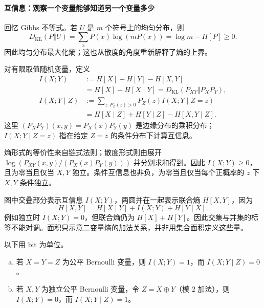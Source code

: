 \documentclass[lang=cn,a4paper,fontset=none,zihao=false,10pt,openany,twoside]{beautybook}
\numberwithin{algorithm}{chapter}
\newcommand{\KLsep}{\mathrel{\Vert}}
\begin{document}
\paragraph{互信息：观察一个变量能够知道另一个变量多少}
回忆 Gibbs 不等式。若 $U$ 是 $m$ 个符号上的均匀分布，则
\[
 D_{\mathrm{KL}}(P\KLsep U)=\sum_xP(x)\log(mP(x))=\log m-H[P]\ge0.
\]
因此均匀分布最大化熵；这也从散度的角度重新解释了熵的上界。
\begin{definition}[互信息与条件互信息]\label{def:mutual-information}
对有限取值随机变量，定义
\begin{align*}
 I(X;Y)&:=H[X]+H[Y]-H[X,Y]\\
 &=H[X]-H[X\mid Y]=D_{\mathrm{KL}}(P_{XY}\KLsep P_XP_Y),\\
 I(X;Y\mid Z)&:=\sum_{z:P_Z(z)>0}P_Z(z)I(X;Y\mid Z=z)\\
 &=H[X\mid Z]+H[Y\mid Z]-H[X,Y\mid Z].
\end{align*}
这里 $(P_XP_Y)(x,y)=P_X(x)P_Y(y)$ 是边缘分布的乘积分布；$I(X;Y\mid Z=z)$ 指在给定 $Z=z$ 的条件分布下计算互信息。
\end{definition}
熵形式的等价性来自链式法则；散度形式则由展开
$\log(P_{XY}(x,y)/(P_X(x)P_Y(y)))$ 并分别求和得到。因此 $I(X;Y)\ge0$，且为零当且仅当 $X,Y$ 独立。条件互信息也非负，为零当且仅当每个正概率的 $z$ 下 $X,Y$ 条件独立。
\begin{center}
\end{center}
图中交叠部分表示互信息 $I(X;Y)$，两圆并在一起表示联合熵 $H[X,Y]$，因为
\[
 H[X,Y]=H[X\mid Y]+I(X;Y)+H[Y\mid X].
\]
例如独立时 $I(X;Y)=0$，但联合熵仍为 $H[X]+H[Y]$。因此交集与并集的标签不能对调。面积只示意二变量熵的加法关系，并非用集合面积定义这些量。
\begin{example}[条件化可以增大或减小互信息]
以下用 bit 为单位。
\begin{enumerate}[(a)]
\item 若 $X=Y=Z$ 为公平 Bernoulli 变量，则 $I(X;Y)=1$，而 $I(X;Y\mid Z)=0$。
\item 若 $X,Y$ 为独立公平 Bernoulli 变量，令 $Z=X\oplus Y$（模 $2$ 加法），则 $I(X;Y)=0$，而 $I(X;Y\mid Z)=1$。
\end{enumerate}
\end{example}
\end{document}
